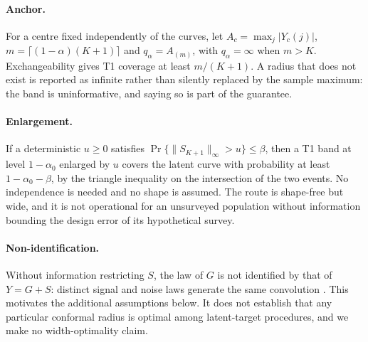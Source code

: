 \paragraph{Anchor.} For a centre fixed independently of the curves, let
$A_c=\max_j|Y_c(j)|$, $m=\lceil(1-\alpha)(K+1)\rceil$ and $q_\alpha=A_{(m)}$,
with $q_\alpha=\infty$ when $m>K$. Exchangeability gives T1 coverage at least
$m/(K+1)$. A radius that does not exist is reported as infinite rather than
silently replaced by the sample maximum: the band is uninformative, and saying
so is part of the guarantee.

\paragraph{Enlargement.} If a deterministic $u\ge0$ satisfies
$\Pr\{\|S_{K+1}\|_\infty>u\}\le\beta$, then a T1 band at level $1-\alpha_0$
enlarged by $u$ covers the latent curve with probability at least
$1-\alpha_0-\beta$, by the triangle inequality on the intersection of the two
events. No independence is needed and no shape is assumed. The route is
shape-free but wide, and it is not operational for an unsurveyed population
without information bounding the design error of its hypothetical survey.

\paragraph{Non-identification.} Without information restricting $S$, the law of
$G$ is not identified by that of $Y=G+S$: distinct signal and noise laws
generate the same convolution \citep{fan1991optimal}. This motivates the
additional assumptions below. It does not establish that any particular
conformal radius is optimal among latent-target procedures, and we make no
width-optimality claim.
